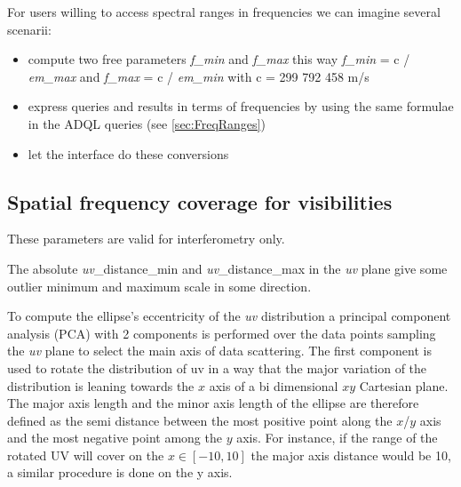 \documentclass[11pt,a4paper]{ivoa}
\begin{document}
For users willing to access spectral ranges in frequencies we can imagine several scenarii:
\begin{itemize}
	\item compute two free parameters \emph{f\_min} and \emph{f\_max} this way \emph{f\_min} = c / \emph{em\_max} and \emph{f\_max} = c / \emph{em\_min} with c = 299 792 458 m/s
	\item express queries and results in terms of frequencies by using the same  formulae in the ADQL queries (see \ref{sec:FreqRanges})

	\item let the interface do these conversions	
\end{itemize}


\subsection{Spatial frequency coverage for visibilities  }
These parameters are valid for interferometry only.

The absolute \emph{uv}\_distance\_min and \emph{uv}\_distance\_max  in the \emph{uv} plane give some outlier minimum and maximum scale in some direction.

To compute the ellipse's eccentricity of the \emph{uv} distribution a principal component analysis
(PCA) with 2 components is performed over the data points sampling the \emph{uv} plane to select the
main axis of data scattering. 
The first component is used to rotate the distribution of uv in a way that the major variation
of the distribution is leaning towards the $x$ axis of a bi dimensional $xy$ Cartesian plane.
The major axis length and the minor axis length of the ellipse are therefore defined as the
semi distance between the most positive point along the $x$/$y$ axis and the most negative point
among the $y$ axis. For instance, if the range of the rotated UV will cover on the $x \in [-10,
10]$ the major axis distance would be 10, a similar procedure is done on the y axis.
\end{document}
